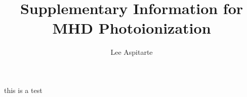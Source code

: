 \documentclass[]{article}
\title{Supplementary Information for MHD Photoionization}
\author{Lee Aspitarte}
\begin{document}
\maketitle

this is a test

\cite{alkemadeMetalVapoursFlames1982}

\printbibliography[title={References}]
\end{document}
